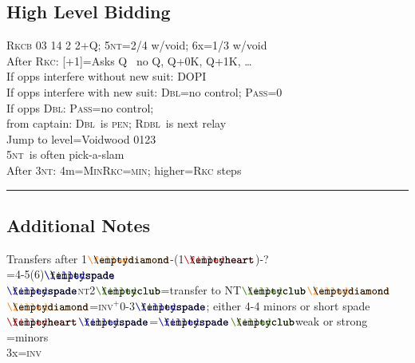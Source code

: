 \documentclass{article}
\newcommand\coloredsuitsymbol[3]{\ensuremath{\mathrel{\raisebox{-0.3pt}{{\color{#1}#2}\llap{#3}}}}}
\newcommand\suitsymbol[3]{\coloredsuitsymbol{#1}{#2}{#3}}%
\newcommand\C{\suitsymbol{clubcolor}{\filledclub}{\emptyclub}}
\newcommand\D{\suitsymbol{diamondcolor}{\filleddiamond}{\emptydiamond}}
\renewcommand\H{\suitsymbol{heartcolor}{\filledheart}{\emptyheart}}
\renewcommand\S{\suitsymbol{spadecolor}{\filledspade}{\emptyspade}}
\newcommand\N{\caps{nt}}
\newcommand\PASS{\caps{Pass}}
\newcommand\X{\caps{Dbl}}
\newcommand\XX{\caps{Rdbl}}
\newcommand\caps[1]{{\scshape#1}}
\newcommand\Min{\caps{min}}
\newcommand\INV{\caps{inv}}
\newcommand\more{\ensuremath{^+}}
\newcommand{\smallsection}[1]{\vspace{-1ex}\subsection*{#1}\raggedright}
\newcommand{\thinrule}{\rule{\textwidth}{\arrayrulewidth}}
\newcommand{\myendrule}{\vspace{-1.5ex}\thinrule}
\begin{document}
\begin{minipage}[t]{90mm}
\smallsection{High Level Bidding}
\caps{Rkcb} 03 14 2 2+Q; 5\N=2/4 w/void; 6x=1/3 w/void\\
After \caps{Rkc}: [+1]=Asks Q \rightarrow\ no Q, Q+0K, Q+1K, \ldots\\
\quad If opps interfere without new suit: \caps{DOPI}\\
\quad If opps interfere with new suit: \X=no control; \PASS=0\\
\quad If opps \X: \PASS=no control; \\
\quad from captain: \X\ is \caps{pen}; \XX\ is next relay\\
Jump to  level=Voidwood 0123\\
5\N\ is often pick-a-slam\\
After 3\N: 4m=\caps{MinRkc}\rightarrow[+1]=\Min; higher=\caps{Rkc} steps\\
\myendrule
\end{minipage}
\hfill
\begin{minipage}[t]{90mm}
\smallsection{Additional Notes}
Transfers after 1\D-(1\H)-?\\
\quad\X=4-5(6)\S\\
\S\N2\C=transfer to NT\C\D\\
\D=\INV\more 0-3\S; either 4-4 minors or short spade\\
\H\S=\S\C weak or strong\\
\quad2\N=minors\\
\quad3x=\INV


\end{minipage}
\hfill\hfill
\end{document}
